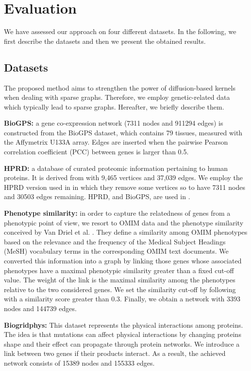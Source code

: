 
\section{Evaluation}
\label{evaluation}
We have assessed our approach on four different datasets. In the following, we first describe the datasets and then we present the obtained results.
\subsection{Datasets}
The proposed method aims to strengthen the power of diffusion-based kernels when dealing with sparse graphs. Therefore, we employ  genetic-related data which typically lead to sparse graphs. Hereafter, we briefly describe them.

\textbf{BioGPS:} a gene co-expression network (7311 nodes and 911294 edges) is constructed from the BioGPS dataset, which contains 79 tissues, measured with the Affymetrix U133A array. Edges are inserted when the pairwise Pearson correlation coefficient (PCC) between genes is larger than 0.5.

\textbf{HPRD:} a database of curated proteomic information pertaining to human proteins. It is derived from \cite{jour5} with 9,465 vertices and 37,039 edges. We employ the HPRD version used in \cite{jour6} in which they remove some vertices so to have 7311 nodes and 30503 edges remaining. HPRD, and  BioGPS, are used in \cite{proceeding3}.

\textbf{Phenotype similarity:} in order to capture the relatedness of genes from a phenotypic point of view, we resort to OMIM \cite{jour4} data and the phenotype similarity conceived by Van Driel et al. \cite{jour5}. They define a similarity among OMIM phenotypes based on the relevance and the frequency of the Medical Subject Headings (MeSH) vocabulary terms in the corresponding OMIM text documents. We converted this information into a graph by linking those genes whose associated phenotypes have a maximal phenotypic similarity greater than a fixed cut-off value. The weight of the link is the maximal similarity among the phenotypes relative to the two considered genes. We set the similarity cut-off by following \cite{jour5} with a similarity score greater than $0.3$. Finally, we obtain a network with 3393 nodes and 144739 edges.

\textbf{Biogridphys:} This dataset represents the physical interactions among proteins. The idea is that mutations can affect physical interactions by changing proteins shape and their effect can propagate through protein networks. We introduce a link between two genes if their products interact. As a result, the achieved network consists of 15389 nodes and 155333 edges.

